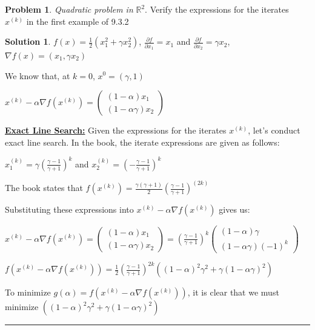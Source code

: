 \documentclass{article}
\theoremstyle{definition}
\newtheorem{problem}{Problem}
\def\fline{\rule{0.75\linewidth}{0.5pt}}
\newcommand{\finishline}{\begin{center}\fline\end{center}}
\newtheorem*{solution*}{Solution}
\newenvironment{solution}{\begin{solution*}}{{\finishline} \end{solution*}}
\begin{document}
\begin{problem} \textit{Quadratic problem in } $\mathbb{R}^2.$  Verify the expressions for the iterates $x^{(k)}$ in the first example of 9.3.2

\begin{solution} 
$f(x) = \frac{1}{2} (x_1^2 + \gamma x_2^2)$, $\frac{\partial{f}}{\partial{x_1}} = x_1$ and $\frac{\partial{f}}{\partial{x_2}} = \gamma x_2$, $\nabla f(x) = (x_1, \gamma x_2)$ \newline 

We know that, at $k = 0$, $x^0 = (\gamma, 1)$ \newline 


$x^{(k)} - \alpha \nabla f(x^{(k)}) = \begin{pmatrix}
(1 - \alpha) x_1 \\
(1 - \alpha \gamma) x_2
\end{pmatrix}$

\textbf{\underline{Exact Line Search:}} \newline 
Given the expressions for the iterates $x^{(k)}$, let's conduct exact line search. In the book, the iterate expressions are given as follows: \newline 

$x_1^{(k)} = \gamma (\frac{\gamma - 1}{\gamma + 1})^k$ and $x_2^{(k)} = (-\frac{\gamma - 1}{\gamma + 1})^k$

The book states that $f(x^{(k)}) = \frac{\gamma (\gamma + 1)}{2} (\frac{\gamma - 1}{\gamma + 1})^{(2k)}$

Substituting these expressions into $x^{(k)} - \alpha \nabla f(x^{(k)})$ gives us: \newline 

$x^{(k)} - \alpha \nabla f(x^{(k)}) = \begin{pmatrix}
(1 - \alpha) x_1 \\
(1 - \alpha \gamma) x_2
\end{pmatrix} = (\frac{\gamma - 1}{\gamma + 1})^k \begin{pmatrix}
(1 - \alpha) \gamma \\
(1 - \alpha \gamma) (-1)^k
\end{pmatrix}$ \newline 

$f(x^{(k)} - \alpha \nabla f(x^{(k)})) = \frac{1}{2} (\frac{\gamma - 1}{\gamma + 1})^{2k} ((1 - \alpha)^2 \gamma^2 + \gamma (1 - \alpha \gamma)^2)$ \newline 

To minimize $g(\alpha) = f(x^{(k)} - \alpha \nabla f(x^{(k)}))$, it is clear that we must minimize $((1 - \alpha)^2 \gamma^2 + \gamma (1 - \alpha \gamma)^2)$


\end{solution}
\end{problem}
\end{document}

